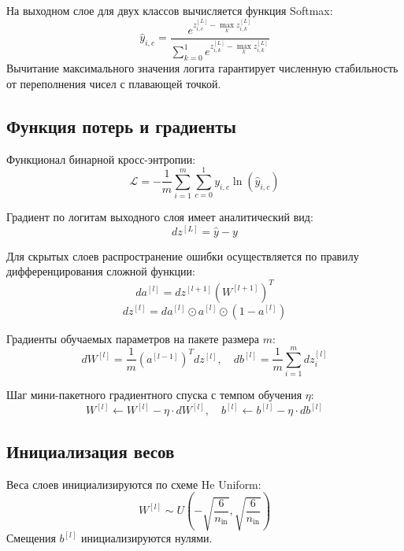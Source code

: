 \documentclass[a4paper,14pt]{extarticle}
\begin{document}
На выходном слое для двух классов вычисляется функция Softmax:
\begin{equation}
    \hat{y}_{i, c} = \frac{e^{z_{i, c}^{[L]} - \max_k z_{i, k}^{[L]}}}{\sum_{k=0}^{1} e^{z_{i, k}^{[L]} - \max_k z_{i, k}^{[L]}}}
\end{equation}
Вычитание максимального значения логита гарантирует численную стабильность от переполнения чисел с плавающей точкой.

\subsection{Функция потерь и градиенты}

Функционал бинарной кросс-энтропии:
\begin{equation}
    \mathcal{L} = -\frac{1}{m} \sum_{i=1}^{m} \sum_{c=0}^{1} y_{i, c} \ln(\hat{y}_{i, c})
\end{equation}

Градиент по логитам выходного слоя имеет аналитический вид:
\begin{equation}
    dz^{[L]} = \hat{y} - y
\end{equation}

Для скрытых слоев распространение ошибки осуществляется по правилу дифференцирования сложной функции:
\begin{equation}
    da^{[l]} = dz^{[l+1]} (W^{[l+1]})^T
\end{equation}
\begin{equation}
    dz^{[l]} = da^{[l]} \odot a^{[l]} \odot (1 - a^{[l]})
\end{equation}

Градиенты обучаемых параметров на пакете размера $m$:
\begin{equation}
    dW^{[l]} = \frac{1}{m} (a^{[l-1]})^T dz^{[l]}, \quad db^{[l]} = \frac{1}{m} \sum_{i=1}^m dz_i^{[l]}
\end{equation}

Шаг мини-пакетного градиентного спуска с темпом обучения $\eta$:
\begin{equation}
    W^{[l]} \leftarrow W^{[l]} - \eta \cdot dW^{[l]}, \quad b^{[l]} \leftarrow b^{[l]} - \eta \cdot db^{[l]}
\end{equation}

\subsection{Инициализация весов}

Веса слоев инициализируются по схеме He Uniform:
\begin{equation}
    W^{[l]} \sim U\left(-\sqrt{\frac{6}{n_{\text{in}}}}, \sqrt{\frac{6}{n_{\text{in}}}}\right)
\end{equation}
Смещения $b^{[l]}$ инициализируются нулями.
\end{document}
